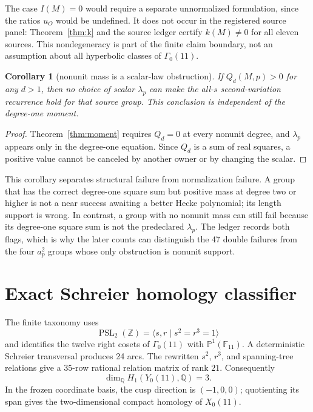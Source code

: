\documentclass[11pt]{article}
\newtheorem{corollary}[theorem]{Corollary}
\theoremstyle{definition}
\theoremstyle{remark}
\newcommand{\G}{\Gamma_0(11)}
\newcommand{\QQ}{\mathbb Q}
\begin{document}
The case $I(M)=0$ would require a separate unnormalized formulation, since the ratios $u_O$ would be undefined. It does not occur in the registered source panel: Theorem~\ref{thm:k} and the source ledger certify $k(M)\neq0$ for all eleven sources. This nondegeneracy is part of the finite claim boundary, not an assumption about all hyperbolic classes of $\G$.

\begin{corollary}[nonunit mass is a scalar-law obstruction]\label{cor:nonunit}
If $Q_d(M,p)>0$ for any $d>1$, then no choice of scalar $\lambda_p$ can make the all-$s$ second-variation recurrence hold for that source group. This conclusion is independent of the degree-one moment.
\end{corollary}

\begin{proof}
Theorem~\ref{thm:moment} requires $Q_d=0$ at every nonunit degree, and $\lambda_p$ appears only in the degree-one equation. Since $Q_d$ is a sum of real squares, a positive value cannot be canceled by another owner or by changing the scalar.
\end{proof}

This corollary separates structural failure from normalization failure. A group that has the correct degree-one square sum but positive mass at degree two or higher is not a near success awaiting a better Hecke polynomial; its length support is wrong. In contrast, a group with no nonunit mass can still fail because its degree-one square sum is not the predeclared $\lambda_p$. The ledger records both flags, which is why the later counts can distinguish the 47 double failures from the four $a_p^2$ groups whose only obstruction is nonunit support.

\section{Exact Schreier homology classifier}

The finite taxonomy uses
\[
\operatorname{PSL}_2(\mathbb Z)=\langle s,r\mid s^2=r^3=1\rangle
\]
and identifies the twelve right cosets of $\G$ with $\mathbb P^1(\mathbb F_{11})$. A deterministic Schreier transversal produces 24 arcs. The rewritten $s^2$, $r^3$, and spanning-tree relations give a $35$-row rational relation matrix of rank $21$. Consequently
\[
\dim_\QQ H_1(Y_0(11),\QQ)=3.
\]
In the frozen coordinate basis, the cusp direction is $(-1,0,0)$; quotienting its span gives the two-dimensional compact homology of $X_0(11)$.
\end{document}

